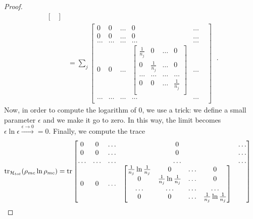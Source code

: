 \begin{proof}
\begin{equation*}
\begin{aligned}
\begin{bmatrix}
            \end{bmatrix} \\ & = \sum_j \begin{bmatrix}
                0 & 0 & \ldots & 0 & \ldots \\ 
                0 & 0 & \ldots & 0 & \ldots \\ 
                \ldots & \ldots & \ldots & \ldots & \ldots & \\
                0 & 0 & \ldots & \begin{bmatrix}
                    \frac{1}{n_j} & 0 & \ldots & 0 \\
                    0 & \frac{1}{n_j} & \ldots & 0 \\
                    \ldots & \ldots & \ldots & \ldots \\
                    0 & 0 & \ldots & \frac{1}{n_j} \\
                \end{bmatrix} & \ldots & \\
                \ldots & \ldots & \ldots & \ldots & \ldots  \\
            \end{bmatrix}
        \end{aligned} ~.
        \end{equation*}
        Now, in order to compute the logarithm of $0$, we use a trick: we define a small parameter $\epsilon$ and we make it go to zero. In this way, the limit becomes $\epsilon \ln \epsilon \xrightarrow{\epsilon \rightarrow 0} = 0$. Finally, we compute the trace 
        \begin{equation*}
        \begin{aligned}
            \operatorname{tr}_{\mathcal H_{tot}} ( \rho_{mc} \ln \rho_{mc}) & = \operatorname{tr} \begin{bmatrix}
                0 & 0 & \ldots & 0 & \ldots  \\ 
                0 & 0 & \ldots & 0 & \ldots  \\ 
                \ldots & \ldots & \ldots & \ldots & \ldots  \\
                0 & 0 & \ldots & \begin{bmatrix}
                    \frac{1}{n_j} \ln \frac{1}{n_j} & 0 & \ldots & 0 \\
                    0 & \frac{1}{n_j} \ln \frac{1}{n_j} & \ldots & 0 \\
                    \ldots & \ldots & \ldots & \ldots \\
                    0 & 0 & \ldots & \frac{1}{n_j} \ln \frac{1}{n_j} \\

\end{bmatrix}
\end{bmatrix}
\end{aligned}
\end{equation*}
\end{proof}
